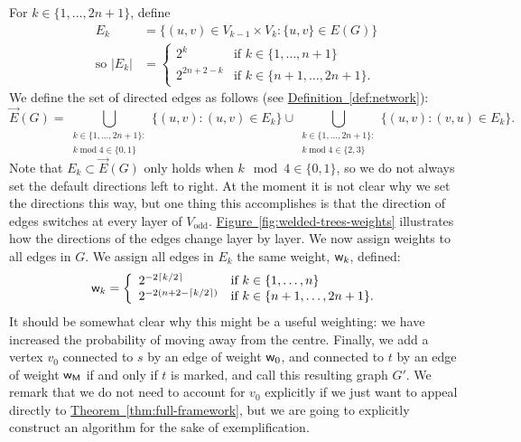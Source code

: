 \documentclass{article}
\newcommand{\thm}[1]{\hyperref[thm:#1]{Theorem~\ref*{thm:#1}}}
\newcommand{\defin}[1]{\hyperref[def:#1]{Definition~\ref*{def:#1}}}
\newcommand{\fig}[1]{\hyperref[fig:#1]{Figure~\ref*{fig:#1}}}
\renewcommand{\>}{\rangle}
\newcommand{\<}{\langle}
\renewcommand{\(}{\left(}
\renewcommand{\)}{\right)}
\def\w{{\sf w}}
\begin{document}
For $k\in \{1,\dots,2n+1\}$, define
\begin{equation}
\begin{split}
E_k&=\{(u,v)\in V_{k-1}\times V_k: \{u,v\}\in E(G)\}\\
\mbox{so }|E_k| &= \left\{\begin{array}{ll}
2^k & \mbox{if }k\in\{1,\dots,n+1\}\\
2^{2n+2-k} &\mbox{if }k\in\{n+1,\dots,2n+1\}.
\end{array}\right.
\end{split}\label{eq:welded-E_k}
\end{equation}
We define the set of directed edges as follows (see \defin{network}):
\begin{equation} 
\overrightarrow{E}(G)=\bigcup_{\substack{k\in\{1,\dots,2n+1\}:\\k\;\mathrm{mod}\; 4\in \{0,1\}}}\{(u,v):(u,v)\in E_k\}
\cup \bigcup_{\substack{k\in\{1,\dots,2n+1\}:\\k\;\mathrm{mod}\; 4\in \{2,3\}}}\{(u,v):(v,u)\in E_k\}.\label{eq:welded-EG}
\end{equation}
Note that $E_k\subset \overrightarrow{E}(G)$ only holds when $k\mod 4 \in \{0,1\}$, so we do not always set the default directions left to right. 
At the moment it is not clear why we set the directions this way, but one thing this accomplishes is that the direction of edges switches at every layer of $V_{\mathrm{odd}}$. \fig{welded-trees-weights} illustrates how the directions of the edges change layer by layer. 
We now assign weights to all edges in $G$. We assign all edges in $E_k$ the same weight, $\w_k$, defined:
\begin{equation}
\w_k=\left\{\begin{array}{ll}
2^{-2\lceil k/2\rceil} & \mbox{if }k\in\{1,\dots,n\}\\
2^{-2(n+2-\lceil k/2\rceil)} & \mbox{if }k\in\{n+1,\dots,2n+1\}.
\end{array}\right.\label{eq:welded-w_k}
\end{equation}
It should be somewhat clear why this might be a useful weighting: we have increased the probability of moving away from the centre. Finally, we add a vertex $v_0$ connected to $s$ by an edge of weight $\w_0$, and connected to $t$ by an edge of weight $\w_{\sf M}$ if and only if $t$ is marked, and call this resulting graph $G'$. We remark that we do not need to account for $v_0$ explicitly if we just want to appeal directly to \thm{full-framework}, but we are going to explicitly construct an algorithm for the sake of exemplification. 
\end{document}
